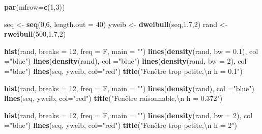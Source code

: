\documentclass[
]{book}
\newenvironment{Shaded}{\begin{snugshade}}{\end{snugshade}}
\newcommand{\CharTok}[1]{\textcolor[rgb]{0.31,0.60,0.02}{#1}}
\newcommand{\DataTypeTok}[1]{\textcolor[rgb]{0.13,0.29,0.53}{#1}}
\newcommand{\DecValTok}[1]{\textcolor[rgb]{0.00,0.00,0.81}{#1}}
\newcommand{\FloatTok}[1]{\textcolor[rgb]{0.00,0.00,0.81}{#1}}
\newcommand{\KeywordTok}[1]{\textcolor[rgb]{0.13,0.29,0.53}{\textbf{#1}}}
\newcommand{\NormalTok}[1]{#1}
\newcommand{\StringTok}[1]{\textcolor[rgb]{0.31,0.60,0.02}{#1}}
\begin{document}
\begin{Shaded}
\begin{Highlighting}[]
\KeywordTok{par}\NormalTok{(}\DataTypeTok{mfrow=}\KeywordTok{c}\NormalTok{(}\DecValTok{1}\NormalTok{,}\DecValTok{3}\NormalTok{))}

\NormalTok{seq <-}\StringTok{ }\KeywordTok{seq}\NormalTok{(}\DecValTok{0}\NormalTok{,}\DecValTok{6}\NormalTok{, }\DataTypeTok{length.out =} \DecValTok{40}\NormalTok{)}
\NormalTok{yweib <-}\StringTok{ }\KeywordTok{dweibull}\NormalTok{(seq,}\FloatTok{1.7}\NormalTok{,}\DecValTok{2}\NormalTok{)}
\NormalTok{rand <-}\KeywordTok{rweibull}\NormalTok{(}\DecValTok{500}\NormalTok{,}\FloatTok{1.7}\NormalTok{,}\DecValTok{2}\NormalTok{)}

\KeywordTok{hist}\NormalTok{(rand, }\DataTypeTok{breaks =} \DecValTok{12}\NormalTok{, }\DataTypeTok{freq =}\NormalTok{ F, }\DataTypeTok{main =} \StringTok{""}\NormalTok{)}
\KeywordTok{lines}\NormalTok{(}\KeywordTok{density}\NormalTok{(rand, }\DataTypeTok{bw =} \FloatTok{0.1}\NormalTok{), }\DataTypeTok{col =}\StringTok{"blue"}\NormalTok{)}
\KeywordTok{lines}\NormalTok{(}\KeywordTok{density}\NormalTok{(rand), }\DataTypeTok{col =}\StringTok{"blue"}\NormalTok{)}
\KeywordTok{lines}\NormalTok{(}\KeywordTok{density}\NormalTok{(rand, }\DataTypeTok{bw =} \DecValTok{2}\NormalTok{), }\DataTypeTok{col =}\StringTok{"blue"}\NormalTok{)}
\KeywordTok{lines}\NormalTok{(seq, yweib, }\DataTypeTok{col=}\StringTok{"red"}\NormalTok{)}
\KeywordTok{title}\NormalTok{(}\StringTok{"Fenêtre trop petite,}\CharTok{\textbackslash{}n}\StringTok{ h = 0.1"}\NormalTok{)}

\KeywordTok{hist}\NormalTok{(rand, }\DataTypeTok{breaks =} \DecValTok{12}\NormalTok{, }\DataTypeTok{freq =}\NormalTok{ F, }\DataTypeTok{main =} \StringTok{""}\NormalTok{)}
\KeywordTok{lines}\NormalTok{(}\KeywordTok{density}\NormalTok{(rand), }\DataTypeTok{col =}\StringTok{"blue"}\NormalTok{)}
\KeywordTok{lines}\NormalTok{(seq, yweib, }\DataTypeTok{col=}\StringTok{"red"}\NormalTok{)}
\KeywordTok{title}\NormalTok{(}\StringTok{"Fenêtre raisonnable,}\CharTok{\textbackslash{}n}\StringTok{ h = 0.372"}\NormalTok{)}

\KeywordTok{hist}\NormalTok{(rand, }\DataTypeTok{breaks =} \DecValTok{12}\NormalTok{, }\DataTypeTok{freq =}\NormalTok{ F, }\DataTypeTok{main =} \StringTok{""}\NormalTok{)}
\KeywordTok{lines}\NormalTok{(}\KeywordTok{density}\NormalTok{(rand, }\DataTypeTok{bw =} \DecValTok{2}\NormalTok{), }\DataTypeTok{col =}\StringTok{"blue"}\NormalTok{)}
\KeywordTok{lines}\NormalTok{(seq, yweib, }\DataTypeTok{col=}\StringTok{"red"}\NormalTok{)}
\KeywordTok{title}\NormalTok{(}\StringTok{"Fenêtre trop petite,}\CharTok{\textbackslash{}n}\StringTok{ h = 2"}\NormalTok{)}
\end{Highlighting}
\end{Shaded}
\end{document}
